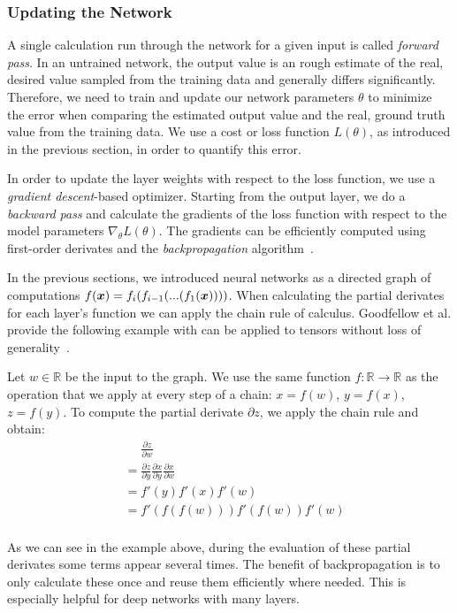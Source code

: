 \subsubsection{Updating the Network}
A single calculation run through the network for a given input is called \emph{forward pass}. In an untrained network, the output value is an rough estimate of the real, desired value sampled from the training data  and generally differs significantly. Therefore, we need to train and update our network parameters $\theta$ to minimize the error when comparing the estimated output value and the real, ground truth value from the training data. We use a cost or loss function $L(\theta)$, as introduced in the previous section, in order to quantify this error.

In order to update the layer weights with respect to the loss function, we use a \emph{gradient descent}-based optimizer. Starting from the output layer, we do a \emph{backward pass} and calculate the gradients of the loss function with respect to the model parameters $\nabla_\theta L(\theta)$. The gradients can be efficiently computed using first-order derivates and the \emph{backpropagation} algorithm~\cite{rumelhart1985learning}.

In the previous sections, we introduced neural networks as a directed graph of computations $ f(\boldsymbol{x}) = f_i(f_{i-1}(...(f_1(\boldsymbol{x})))) $. When calculating the partial derivates for each layer's function we can apply the chain rule of calculus. Goodfellow et al. provide the following example with can be applied to tensors without loss of generality~\cite{Goodfellow-et-al-2016}. 

Let $w \in\mathbb{R}$ be the input to the graph. We use the same function $f: \mathbb{R} \rightarrow \mathbb{R}$ as the operation that we apply at every step of a chain: $x = f(w)$, $y = f(x)$, $z = f(y)$. To compute the partial derivate $\partial z$, we apply the chain rule and obtain:
$$
\begin{aligned}
&\phantom{{}={}} \frac{\partial z}{\partial w} \\
&= \frac{\partial z}{\partial y} \frac{\partial x}{\partial y}  \frac{\partial x}{\partial w} \\
&= f'(y) f'(x) f'(w) \\
&= f'(f(f(w)))f'(f(w))f'(w) \\
\end{aligned}
$$

As we can see in the example above, during the evaluation of these partial derivates some terms appear several times. The benefit of  backpropagation is to only calculate these once and reuse them efficiently where needed. This is especially helpful for deep networks with many layers.

